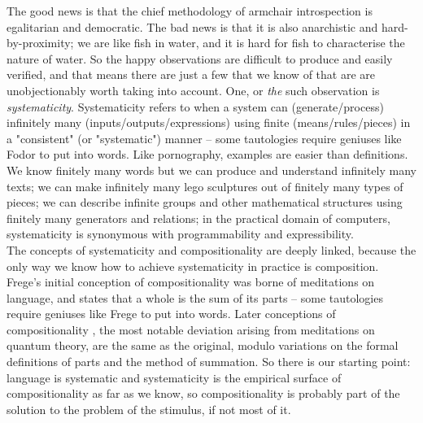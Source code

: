 \begin{fullwidth}
\begin{multicols}{2}
 The good news is that the chief methodology of armchair introspection is egalitarian and democratic. The bad news is that it is also anarchistic and hard-by-proximity; we are like fish in water, and it is hard for fish to characterise the nature of water. So the happy observations are difficult to produce and easily verified, and that means there are just a few that we know of that are are unobjectionably worth taking into account. One, or \emph{the} such observation is \emph{systematicity}. Systematicity \citep{} refers to when a system can (generate/process) infinitely many (inputs/outputs/expressions) using finite (means/rules/pieces) in a "consistent" (or "systematic") manner -- some tautologies require geniuses like Fodor to put into words. Like pornography, examples are easier than definitions. We know finitely many words but we can produce and understand infinitely many texts; we can make infinitely many lego sculptures out of finitely many types of pieces; we can describe infinite groups and other mathematical structures using finitely many generators and relations; in the practical domain of computers, systematicity is synonymous with programmability and expressibility.\\

The concepts of systematicity and compositionality are deeply linked, because the only way we know how to achieve systematicity in practice is composition. Frege's initial conception of compositionality \citep{} was borne of meditations on language, and states that a whole is the sum of its parts -- some tautologies require geniuses like Frege to put into words. Later conceptions of compositionality \citep{}, the most notable deviation arising from meditations on quantum theory, are the same as the original, modulo variations on the formal definitions of parts and the method of summation. So there is our starting point: language is systematic and systematicity is the empirical surface of compositionality as far as we know, so compositionality is probably part of the solution to the problem of the stimulus, if not most of it.\\


\end{multicols}
\end{fullwidth}
